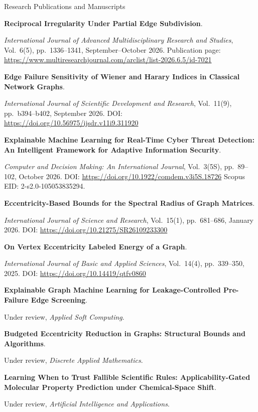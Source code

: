 \begin{rubric}{Research Publications and Manuscripts}


\entry*[2026]%
\textbf{Reciprocal Irregularity Under Partial Edge Subdivision}.\par
\emph{International Journal of Advanced Multidisciplinary Research and Studies}, Vol.~6(5), pp.~1336--1341, September--October 2026. Publication page: \url{https://www.multiresearchjournal.com/arclist/list-2026.6.5/id-7021}

\entry*[2026]%
\textbf{Edge Failure Sensitivity of Wiener and Harary Indices in Classical Network Graphs}.\par
\emph{International Journal of Scientific Development and Research}, Vol.~11(9), pp.~b394--b402, September 2026. DOI: \url{https://doi.org/10.56975/ijsdr.v11i9.311920}

\entry*[2026]%
\textbf{Explainable Machine Learning for Real-Time Cyber Threat Detection: An Intelligent Framework for Adaptive Information Security}.\par
\emph{Computer and Decision Making: An International Journal}, Vol.~3(5S), pp.~89--102, October 2026. DOI: \url{https://doi.org/10.1922/comdem.v3i5S.18726} Scopus EID: 2-s2.0-105053835294.

\entry*[2026]%
\textbf{Eccentricity-Based Bounds for the Spectral Radius of Graph Matrices}.\par
\emph{International Journal of Science and Research}, Vol.~15(1), pp.~681--686, January 2026. DOI: \url{https://doi.org/10.21275/SR26109233300}

\entry*[2025]%
\textbf{On Vertex Eccentricity Labeled Energy of a Graph}.\par
\emph{International Journal of Basic and Applied Sciences}, Vol.~14(4), pp.~339--350, 2025. DOI: \url{https://doi.org/10.14419/qtfv0860}


\entry*[2026]%
\textbf{Explainable Graph Machine Learning for Leakage-Controlled Pre-Failure Edge Screening}.\par
Under review, \emph{Applied Soft Computing}.

\entry*[2026]%
\textbf{Budgeted Eccentricity Reduction in Graphs: Structural Bounds and Algorithms}.\par
Under review, \emph{Discrete Applied Mathematics}.

\entry*[2026]%
\textbf{Learning When to Trust Fallible Scientific Rules: Applicability-Gated Molecular Property Prediction under Chemical-Space Shift}.\par
Under review, \emph{Artificial Intelligence and Applications}.


\end{rubric}
